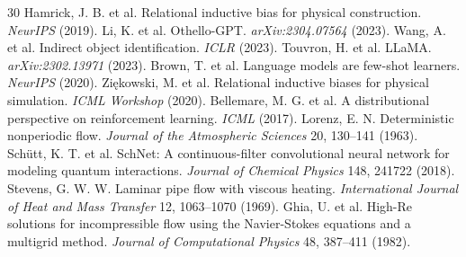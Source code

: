 \documentclass[10pt,twocolumn]{article}
\begin{document}
\begin{thebibliography}{30}
 Hamrick, J. B. et al. Relational inductive bias for physical construction. \textit{NeurIPS} (2019).
 Li, K. et al. Othello-GPT. \textit{arXiv:2304.07564} (2023).
 Wang, A. et al. Indirect object identification. \textit{ICLR} (2023).
 Touvron, H. et al. LLaMA. \textit{arXiv:2302.13971} (2023).
 Brown, T. et al. Language models are few-shot learners. \textit{NeurIPS} (2020).
 Zi\k{e}kowski, M. et al. Relational inductive biases for physical simulation. \textit{ICML Workshop} (2020).
 Bellemare, M. G. et al. A distributional perspective on reinforcement learning. \textit{ICML} (2017).
 Lorenz, E. N. Deterministic nonperiodic flow. \textit{Journal of the Atmospheric Sciences} 20, 130--141 (1963).
 Sch\"{u}tt, K. T. et al. SchNet: A continuous-filter convolutional neural network for modeling quantum interactions. \textit{Journal of Chemical Physics} 148, 241722 (2018).
 Stevens, G. W. W. Laminar pipe flow with viscous heating. \textit{International Journal of Heat and Mass Transfer} 12, 1063--1070 (1969).
 Ghia, U. et al. High-Re solutions for incompressible flow using the Navier-Stokes equations and a multigrid method. \textit{Journal of Computational Physics} 48, 387--411 (1982).
\end{thebibliography}
\end{document}
